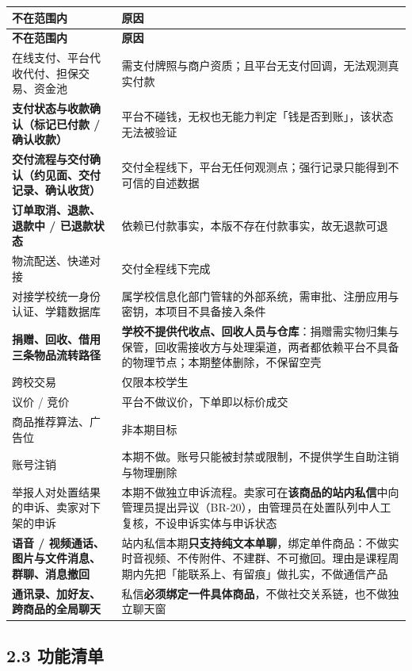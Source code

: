 \documentclass[12pt,a4paper]{ctexart}
\begin{document}
{\scriptsize
\begin{longtable}{|p{2.75cm}|p{13.25cm}|}
\hline
\textbf{不在范围内} & \textbf{原因} \\
\hline
\endfirsthead
\hline
\textbf{不在范围内} & \textbf{原因} \\
\hline
\endhead
\hline
\endfoot
在线支付、平台代收代付、担保交易、资金池 & 需支付牌照与商户资质；且平台无支付回调，无法观测真实付款 \\
\hline
\textbf{支付状态与收款确认（标记已付款 / 确认收款）} & 平台不碰钱，无权也无能力判定「钱是否到账」，该状态无法被验证 \\
\hline
\textbf{交付流程与交付确认（约见面、交付记录、确认收货）} & 交付全程线下，平台无任何观测点；强行记录只能得到不可信的自述数据 \\
\hline
\textbf{订单取消、退款、退款中 / 已退款状态} & 依赖已付款事实，本版不存在付款事实，故无退款可退 \\
\hline
物流配送、快递对接 & 交付全程线下完成 \\
\hline
对接学校统一身份认证、学籍数据库 & 属学校信息化部门管辖的外部系统，需审批、注册应用与密钥，本项目不具备接入条件 \\
\hline
\textbf{捐赠、回收、借用三条物品流转路径} & \textbf{学校不提供代收点、回收人员与仓库}：捐赠需实物归集与保管，回收需接收方与处理渠道，两者都依赖平台不具备的物理节点；本期整体删除，不保留空壳 \\
\hline
跨校交易 & 仅限本校学生 \\
\hline
议价 / 竞价 & 平台不做议价，下单即以标价成交 \\
\hline
商品推荐算法、广告位 & 非本期目标 \\
\hline
账号注销 & 本期不做。账号只能被封禁或限制，不提供学生自助注销与物理删除 \\
\hline
举报人对处置结果的申诉、卖家对下架的申诉 & 本期不做独立申诉流程。卖家可在\textbf{该商品的站内私信}中向管理员提出异议（BR-20），由管理员在处置队列中人工复核，不设申诉实体与申诉状态 \\
\hline
\textbf{语音 / 视频通话、图片与文件消息、群聊、消息撤回} & 站内私信本期\textbf{只支持纯文本单聊}，绑定单件商品：不做实时音视频、不传附件、不建群、不可撤回。理由是课程周期内先把「能联系上、有留痕」做扎实，不做通信产品 \\
\hline
\textbf{通讯录、加好友、跨商品的全局聊天} & 私信\textbf{必须绑定一件具体商品}，不做社交关系链，也不做独立聊天窗 \\
\hline
\end{longtable}
}


\subsection*{2.3 功能清单}
\end{document}

